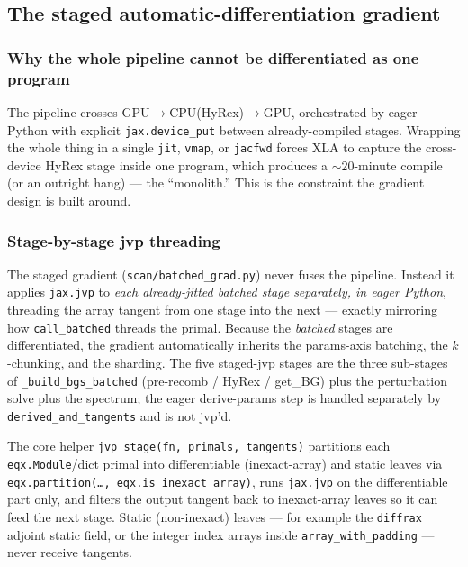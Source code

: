 \documentclass[11pt]{article}
\newcommand{\code}[1]{\texttt{\small #1}}
\newcommand{\file}[1]{\texttt{\small #1}}
\begin{document}
\subsection{The staged automatic-differentiation gradient}
\label{sec:staged}

\subsubsection{Why the whole pipeline cannot be differentiated as one program}
\label{sec:nonjit}

The pipeline crosses GPU$\to$CPU(HyRex)$\to$GPU, orchestrated by eager
Python with explicit \code{jax.device\_put} between already-compiled
stages. Wrapping the whole thing in a single \code{jit}, \code{vmap}, or
\code{jacfwd} forces XLA to capture the cross-device HyRex stage inside
one program, which produces a $\sim20$-minute compile (or an outright
hang) --- the ``monolith.'' This is the constraint the gradient design is
built around.

\subsubsection{Stage-by-stage jvp threading}

The staged gradient (\file{scan/batched\_grad.py}) never fuses the
pipeline. Instead it applies \code{jax.jvp} to \emph{each already-jitted
batched stage separately, in eager Python}, threading the array tangent
from one stage into the next --- exactly mirroring how
\code{call\_batched} threads the primal. Because the \emph{batched}
stages are differentiated, the gradient automatically inherits the
params-axis batching, the $k$-chunking, and the sharding. The five
staged-jvp stages are the three sub-stages of \code{\_build\_bgs\_batched}
(pre-recomb / HyRex / get\_BG) plus the perturbation solve plus the
spectrum; the eager derive-params step is handled separately by
\code{derived\_and\_tangents} and is not jvp'd.

The core helper \code{jvp\_stage(fn, primals, tangents)} partitions each
\code{eqx.Module}/dict primal into differentiable (inexact-array) and
static leaves via \code{eqx.partition(\dots, eqx.is\_inexact\_array)},
runs \code{jax.jvp} on the differentiable part only, and filters the
output tangent back to inexact-array leaves so it can feed the next stage.
Static (non-inexact) leaves --- for example the \code{diffrax} adjoint
static field, or the integer index arrays inside \code{array\_with\_padding}
--- never receive tangents.
\end{document}
